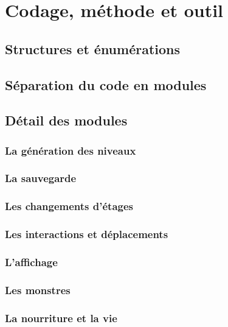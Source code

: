 \documentclass[12pt]{report}
\begin{document}
\chapter{Codage, méthode et outil}

	\section{Structures et énumérations}
	
	\section{Séparation du code en modules}
	
	\section{Détail des modules}
	
		\subsection{La génération des niveaux}
		
		\subsection{La sauvegarde}
		
		\subsection{Les changements d'étages}
		
		\subsection{Les interactions et déplacements}
		
		\subsection{L'affichage}
		
		\subsection{Les monstres}
		
		\subsection{La nourriture et la vie}
		
\end{document}
